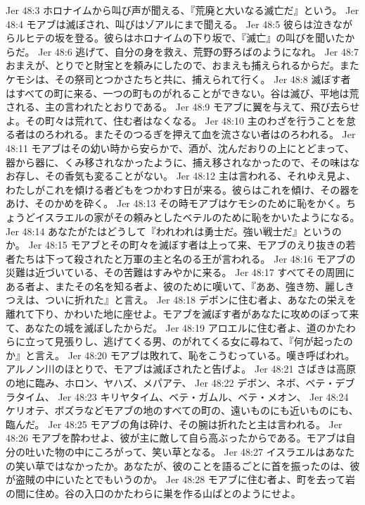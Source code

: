 Jer 48:3  ホロナイムから叫び声が聞える、『荒廃と大いなる滅亡だ』という。
Jer 48:4  モアブは滅ぼされ、叫びはゾアルにまで聞える。
Jer 48:5  彼らは泣きながらルヒテの坂を登る。彼らはホロナイムの下り坂で、『滅亡』の叫びを聞いたからだ。
Jer 48:6  逃げて、自分の身を救え、荒野の野ろばのようになれ。
Jer 48:7  おまえが、とりでと財宝とを頼みにしたので、おまえも捕えられるからだ。またケモシは、その祭司とつかさたちと共に、捕えられて行く。
Jer 48:8  滅ぼす者はすべての町に来る、一つの町ものがれることができない。谷は滅び、平地は荒される、主の言われたとおりである。
Jer 48:9  モアブに翼を与えて、飛び去らせよ。その町々は荒れて、住む者はなくなる。
Jer 48:10  主のわざを行うことを怠る者はのろわれる。またそのつるぎを押えて血を流さない者はのろわれる。
Jer 48:11  モアブはその幼い時から安らかで、酒が、沈んだおりの上にとどまって、器から器に、くみ移されなかったように、捕え移されなかったので、その味はなお存し、その香気も変ることがない。
Jer 48:12  主は言われる、それゆえ見よ、わたしがこれを傾ける者どもをつかわす日が来る。彼らはこれを傾け、その器をあけ、そのかめを砕く。
Jer 48:13  その時モアブはケモシのために恥をかく。ちょうどイスラエルの家がその頼みとしたベテルのために恥をかいたようになる。
Jer 48:14  あなたがたはどうして『われわれは勇士だ。強い戦士だ』というのか。
Jer 48:15  モアブとその町々を滅ぼす者は上って来、モアブのえり抜きの若者たちは下って殺されたと万軍の主と名のる王が言われる。
Jer 48:16  モアブの災難は近づいている、その苦難はすみやかに来る。
Jer 48:17  すべてその周囲にある者よ、またその名を知る者よ、彼のために嘆いて、『ああ、強き笏、麗しきつえは、ついに折れた』と言え。
Jer 48:18  デボンに住む者よ、あなたの栄えを離れて下り、かわいた地に座せよ。モアブを滅ぼす者があなたに攻めのぼって来て、あなたの城を滅ぼしたからだ。
Jer 48:19  アロエルに住む者よ、道のかたわらに立って見張りし、逃げてくる男、のがれてくる女に尋ねて、『何が起ったのか』と言え。
Jer 48:20  モアブは敗れて、恥をこうむっている。嘆き呼ばわれ。アルノン川のほとりで、モアブは滅ぼされたと告げよ。
Jer 48:21  さばきは高原の地に臨み、ホロン、ヤハズ、メパアテ、
Jer 48:22  デボン、ネボ、ベテ・デブラタイム、
Jer 48:23  キリヤタイム、ベテ・ガムル、ベテ・メオン、
Jer 48:24  ケリオテ、ボズラなどモアブの地のすべての町の、遠いものにも近いものにも、臨んだ。
Jer 48:25  モアブの角は砕け、その腕は折れたと主は言われる。
Jer 48:26  モアブを酔わせよ、彼が主に敵して自ら高ぶったからである。モアブは自分の吐いた物の中にころがって、笑い草となる。
Jer 48:27  イスラエルはあなたの笑い草ではなかったか。あなたが、彼のことを語るごとに首を振ったのは、彼が盗賊の中にいたとでもいうのか。
Jer 48:28  モアブに住む者よ、町を去って岩の間に住め。谷の入口のかたわらに巣を作る山ばとのようにせよ。
